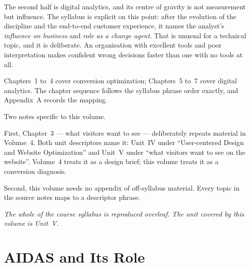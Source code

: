 \documentclass{MMTextbook}
\begin{document}
The second half is digital analytics, and its centre of gravity is not
measurement but influence. The syllabus is explicit on this point: after the
evolution of the discipline and the end-to-end customer experience, it names the
analyst's \emph{influence on business} and \emph{role as a change agent}. That is
unusual for a technical topic, and it is deliberate. An organisation with
excellent tools and poor interpretation makes confident wrong decisions faster
than one with no tools at all.

Chapters~1 to~4 cover conversion optimization; Chapters~5 to~7 cover digital
analytics. The chapter sequence follows the syllabus phrase order exactly, and
Appendix~A records the mapping.

Two notes specific to this volume.

First, Chapter~3 --- what visitors want to see --- deliberately repeats material
in Volume~4. Both unit descriptors name it: Unit~IV under ``User-centered Design
and Website Optimization'' and Unit~V under ``what visitors want to see on the
website''. Volume~4 treats it as a design brief; this volume treats it as a
conversion diagnosis.

Second, this volume needs no appendix of off-syllabus material. Every topic in
the source notes maps to a descriptor phrase.

\vspace{12pt}
\noindent\emph{The whole of the course syllabus is reproduced overleaf. The
unit covered by this volume is Unit~V.}




\cleardoublepage
{}
\tableofcontents
\cleardoublepage
\listoffigures
\cleardoublepage
\listoftables

\mainmatter
\pagestyle{mmmain}

\chapter{AIDAS and Its Role}

\end{document}
